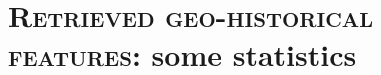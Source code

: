 \documentclass[portrait, A0]{sciposter}
\begin{document}
\begin{minipage}[b]{75cm}
\section{\normalfont \textsc{Retrieved geo-historical features}: some statistics}
\begin{multicols}{3}
\setlength{\columnsep}{80pt}


\footnotesize
{}\label{tab:stats}

\setcellgapes{2pt}

\begin{tabular}{l|cccccccc|c|ccccc|c|r}


\end{tabular}
\end{multicols}
\end{minipage}
\end{document}
